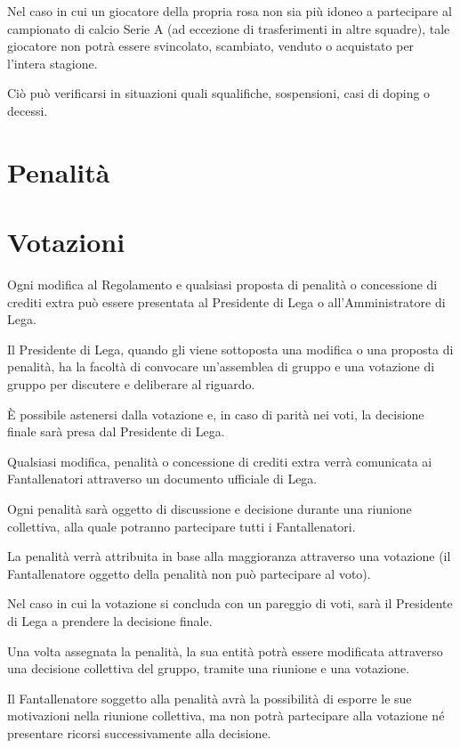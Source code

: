 \documentclass[12pt]{article}
\begin{document}
Nel caso in cui un giocatore della propria rosa non sia più idoneo a partecipare al campionato di calcio Serie A (ad eccezione di trasferimenti in altre squadre), tale giocatore non potrà essere svincolato, scambiato, venduto o acquistato per l'intera stagione.

Ciò può verificarsi in situazioni quali squalifiche, sospensioni, casi di doping o decessi.

\newpage
\section{Penalità}\label{subsec:penalità}

\newpage
\section{Votazioni}

Ogni modifica al Regolamento e qualsiasi proposta di penalità o concessione di crediti extra può essere presentata al Presidente di Lega o all'Amministratore di Lega.

Il Presidente di Lega, quando gli viene sottoposta una modifica o una proposta di penalità, ha la facoltà di convocare un'assemblea di gruppo e una votazione di gruppo per discutere e deliberare al riguardo. 

È possibile astenersi dalla votazione e, in caso di parità nei voti, la decisione finale sarà presa dal Presidente di Lega.

Qualsiasi modifica, penalità o concessione di crediti extra verrà comunicata ai Fantallenatori attraverso un documento ufficiale di Lega.

Ogni penalità sarà oggetto di discussione e decisione durante una riunione collettiva, alla quale potranno partecipare tutti i Fantallenatori.

La penalità verrà attribuita in base alla maggioranza attraverso una votazione (il Fantallenatore oggetto della penalità non può partecipare al voto).

Nel caso in cui la votazione si concluda con un pareggio di voti, sarà il Presidente di Lega a prendere la decisione finale.

Una volta assegnata la penalità, la sua entità potrà essere modificata attraverso una decisione collettiva del gruppo, tramite una riunione e una votazione.

Il Fantallenatore soggetto alla penalità avrà la possibilità di esporre le sue motivazioni nella riunione collettiva, ma non potrà partecipare alla votazione né presentare ricorsi successivamente alla decisione.
\newpage
\end{document}
